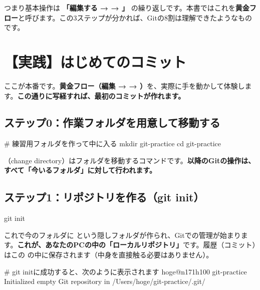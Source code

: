 つまり基本操作は \textbf{「編集する →  → 」} の繰り返しです。本書ではこれを\textbf{黄金フロー}と呼びます。この3ステップが分かれば、Gitの8割は理解できたようなものです。

\section{【実践】はじめてのコミット}

ここが本番です。\textbf{黄金フロー（編集 →  → ）}を、実際に手を動かして体験します。\textbf{この通りに写経すれば、最初のコミットが作れます。}

\subsection{ステップ0：作業フォルダを用意して移動する}

\begin{codebox}[bash]
\begin{code}
# 練習用フォルダを作って中に入る
mkdir git-practice
cd git-practice
\end{code}
\end{codebox}

（change directory）はフォルダを移動するコマンドです。\textbf{以降のGitの操作は、すべて「今いるフォルダ」に対して行われます。}

\subsection{ステップ1：リポジトリを作る（git init）}

\begin{codebox}[bash]
\begin{code}
git init
\end{code}
\end{codebox}

これで今のフォルダに  という隠しフォルダが作られ、Gitでの管理が始まります。\textbf{これが、あなたのPCの中の「ローカルリポジトリ」}です。履歴（コミット）はこの  の中に保存されます（中身を直接触る必要はありません）。

\begin{codebox}[bash]
\begin{code}
# git initに成功すると、次のように表示されます
hoge@n171h100 git-practice %
Initialized empty Git repository in /Users/hoge/git-practice/.git/
\end{code}
\end{codebox}

